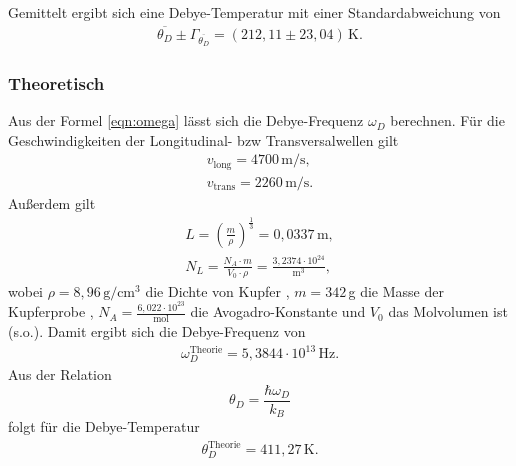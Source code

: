 Gemittelt ergibt sich eine Debye-Temperatur mit einer Standardabweichung von
\begin{align*}
  \overline{\theta_D} \pm \Gamma_{\overline{\theta_D}} = (212,11 \pm 23,04)\,\text{K}.
  \end{align*}

\subsubsection{Theoretisch}
Aus der Formel \eqref{eqn:omega} lässt sich die Debye-Frequenz $\omega_D$ berechnen.
Für die Geschwindigkeiten der Longitudinal- bzw Transversalwellen gilt \cite{skript}
\begin{align*}
  v_{\text{long}} = 4700\,\text{m{/s}}, \\
  v_{\text{trans}} = 2260\,\text{m/s}.
\end{align*}
Außerdem gilt
\begin{gather*}
  L = \left({\frac{m}{\rho}}\right)^{\frac{1}{3}} = 0,0337\,\text{m}, \\
  N_L = \frac{N_A \cdot m}{V_0 \cdot \rho} = \frac{3,2374\cdot10^{24}}{\text{m}^3},
\end{gather*}
wobei $\rho = 8,96\, \text{g}/\text{cm}^3$ die Dichte von Kupfer \cite{cu}, $m = 342$\,g die Masse der Kupferprobe \cite{skript},
$N_A = \frac{6,022\cdot10^{23}}{\text{mol}}$ die Avogadro-Konstante \cite{dem} und $V_0$ das Molvolumen ist (s.o.).
Damit ergibt sich die Debye-Frequenz von
\begin{align*}
  \omega_D^{\text{Theorie}} = 5,3844\cdot10^{13}\,\text{Hz}.
\end{align*}
Aus der Relation
\begin{equation}
  \theta_D = \frac{\hbar\omega_D}{k_B}
\end{equation}
folgt für die Debye-Temperatur
\begin{align*}
  \theta_D^{\text{Theorie}} = 411,27\,\text{K}.
\end{align*}
